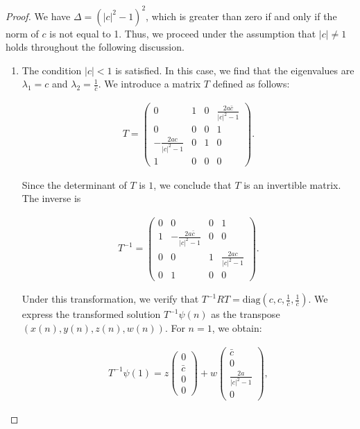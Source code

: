 \documentclass[10pt,a4paper]{amsart}
\begin{document}
\begin{proof}
We have \(\Delta = (|c|^2 - 1)^2\), which is greater than zero if and only if the norm of \(c\) is not equal to 1. Thus, we proceed under the assumption that \(|c| \neq 1\) holds throughout the following discussion.

\begin{enumerate}
    \item The condition \(|c| < 1\) is satisfied. In this case, we find that the eigenvalues are \(\lambda_1 = c\) and \(\lambda_2 = \frac{1}{\bar{c}}\). We introduce a matrix \(T\) defined as follows:

    \begin{align*}
    T = \begin{pmatrix}
    0 & 1 & 0 & \frac{2a \bar{c}}{|c|^2 - 1} \\
    0 & 0 & 0 & 1 \\
    -\frac{2a c}{|c|^2 - 1} & 0 & 1 & 0 \\
    1 & 0 & 0 & 0
    \end{pmatrix}.
    \end{align*}

    Since the determinant of \(T\) is $1$, we conclude that \(T\) is an invertible matrix. The inverse is

    \begin{align*}
    T^{-1} = \begin{pmatrix}
    0 & 0 & 0 & 1 \\
    1 & -\frac{2a \bar{c}}{|c|^2 - 1} & 0 & 0 \\
    0 & 0 & 1 & \frac{2a c}{|c|^2 - 1} \\
    0 & 1 & 0 & 0
    \end{pmatrix}.
    \end{align*}

    Under this transformation, we verify that \(T^{-1} R T = \text{diag}(c, c, \frac{1}{\bar{c}}, \frac{1}{\bar{c}})\). We express the transformed solution \(T^{-1} \psi(n)\) as the transpose \((x(n), y(n), z(n), w(n))\). For \(n = 1\), we obtain:

    \begin{align*}
    T^{-1} \psi(1) = z \begin{pmatrix} 0 \\ \bar{c} \\ 0 \\ 0 \end{pmatrix} + w \begin{pmatrix} \bar{c} \\ 0 \\ \frac{2a}{|c|^2 - 1} \\ 0 \end{pmatrix},
    \end{align*}


\end{enumerate}
\end{proof}
\end{document}
